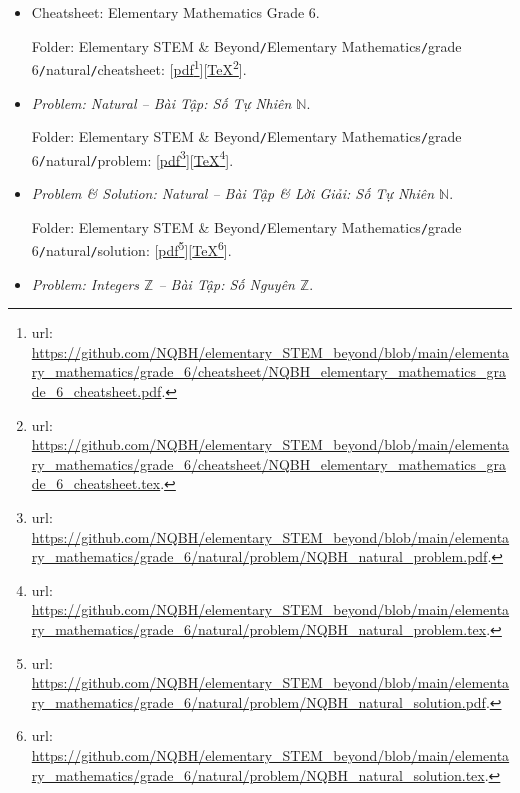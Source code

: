 \documentclass[12pt]{article}
\begin{document}
\begin{itemize}
	\item Cheatsheet: Elementary Mathematics Grade 6.
	
	Folder: {\sf Elementary STEM \& Beyond{\tt/}Elementary Mathematics{\tt/}grade 6{\tt/}natural{\tt/}cheatsheet}: [\href{https://github.com/NQBH/elementary_STEM_beyond/blob/main/elementary_mathematics/grade_6/cheatsheet/NQBH_elementary_mathematics_grade_6_cheatsheet.pdf}{pdf}\footnote{{\sc url}: \url{https://github.com/NQBH/elementary_STEM_beyond/blob/main/elementary_mathematics/grade_6/cheatsheet/NQBH_elementary_mathematics_grade_6_cheatsheet.pdf}.}][\href{https://github.com/NQBH/elementary_STEM_beyond/blob/main/elementary_mathematics/grade_6/cheatsheet/NQBH_elementary_mathematics_grade_6_cheatsheet.tex}{\TeX}\footnote{{\sc url}: \url{https://github.com/NQBH/elementary_STEM_beyond/blob/main/elementary_mathematics/grade_6/cheatsheet/NQBH_elementary_mathematics_grade_6_cheatsheet.tex}.}].
	\item {\it Problem: Natural -- Bài Tập: Số Tự Nhiên $\mathbb{N}$}.
	
	Folder: {\sf Elementary STEM \& Beyond{\tt/}Elementary Mathematics{\tt/}grade 6{\tt/}natural{\tt/}problem}: [\href{https://github.com/NQBH/elementary_STEM_beyond/blob/main/elementary_mathematics/grade_6/natural/problem/NQBH_natural_problem.pdf}{pdf}\footnote{{\sc url}: \url{https://github.com/NQBH/elementary_STEM_beyond/blob/main/elementary_mathematics/grade_6/natural/problem/NQBH_natural_problem.pdf}.}][\href{https://github.com/NQBH/elementary_STEM_beyond/blob/main/elementary_mathematics/grade_6/natural/problem/NQBH_natural_problem.tex}{\TeX}\footnote{{\sc url}: \url{https://github.com/NQBH/elementary_STEM_beyond/blob/main/elementary_mathematics/grade_6/natural/problem/NQBH_natural_problem.tex}.}].
	\item {\it Problem \& Solution: Natural -- Bài Tập \& Lời Giải: Số Tự Nhiên $\mathbb{N}$}.
	
	Folder: {\sf Elementary STEM \& Beyond{\tt/}Elementary Mathematics{\tt/}grade 6{\tt/}natural{\tt/}solution}: [\href{https://github.com/NQBH/elementary_STEM_beyond/blob/main/elementary_mathematics/grade_6/natural/problem/NQBH_natural_solution}{pdf}\footnote{{\sc url}: \url{https://github.com/NQBH/elementary_STEM_beyond/blob/main/elementary_mathematics/grade_6/natural/problem/NQBH_natural_solution.pdf}.}][\href{https://github.com/NQBH/elementary_STEM_beyond/blob/main/elementary_mathematics/grade_6/natural/problem/NQBH_natural_solution.tex}{\TeX}\footnote{{\sc url}: \url{https://github.com/NQBH/elementary_STEM_beyond/blob/main/elementary_mathematics/grade_6/natural/problem/NQBH_natural_solution.tex}.}].
	\item {\it Problem: Integers $\mathbb{Z}$ -- Bài Tập: Số Nguyên $\mathbb{Z}$}.
	

\end{itemize}
\end{document}

